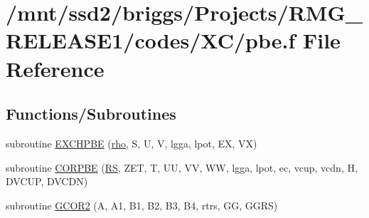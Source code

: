 \hypertarget{pbe_8f}{\section{/mnt/ssd2/briggs/\-Projects/\-R\-M\-G\-\_\-\-R\-E\-L\-E\-A\-S\-E1/codes/\-X\-C/pbe.f File Reference}
\label{pbe_8f}
}
\subsection*{Functions/\-Subroutines}
\begin{DoxyCompactItemize}
\item 
subroutine \hyperlink{pbe_8f_ac710bbd38ba40703729e1693a015050a}{E\-X\-C\-H\-P\-B\-E} (\hyperlink{md_8h_a52b35cee8a5db846ce98f4904e1c8b13}{rho}, S, U, V, lgga, lpot, E\-X, V\-X)
\item 
subroutine \hyperlink{pbe_8f_a9270455d2d210cded3c162e55f0e0206}{C\-O\-R\-P\-B\-E} (\hyperlink{util_8h_acd02ad18d45de9ed7c3653c2f10071a4}{R\-S}, Z\-E\-T, T, U\-U, V\-V, W\-W, lgga, lpot, ec, vcup, vcdn, H, D\-V\-C\-U\-P, D\-V\-C\-D\-N)
\item 
subroutine \hyperlink{pbe_8f_ae6b51ca2fee21d8589a56d0454be232a}{G\-C\-O\-R2} (A, A1, B1, B2, B3, B4, rtrs, G\-G, G\-G\-R\-S)
\end{DoxyCompactItemize}


